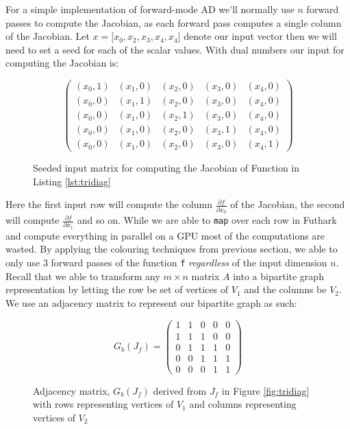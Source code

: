 	For a simple implementation of forward-mode AD we'll normally use
	$n$ forward passes to compute the Jacobian, as each forward pass computes a
	single column of the Jacobian. 	 Let $x = \lbrack x_0, x_2, x_3, x_4, x_4 \rbrack$ denote our input vector then
	we will need to set a seed for each of the scalar values. With dual numbers our input for computing the Jacobian is:
		\begin{figure}[H]
		$$ \left(\begin{matrix}
(x_0, 1) & (x_1, 0) & (x_2, 0) & (x_3, 0) & (x_4, 0) \\
(x_0, 0) & (x_1, 1) & (x_2, 0) & (x_3, 0) & (x_4, 0) \\
(x_0, 0) & (x_1, 0) & (x_2, 1) & (x_3, 0) & (x_4, 0) \\
(x_0, 0) & (x_1, 0) & (x_2, 0) & (x_3, 1) & (x_4, 0) \\
(x_0, 0) & (x_1, 0) & (x_2, 0) & (x_3, 0) & (x_4, 1)
		\end{matrix}\right) $$
		\caption{Seeded input matrix for computing the Jacobian of Function in Listing \ref{lst:tridiag}}
	\end{figure}
    Here the first input row will compute the column $\frac{\partial f}{\partial x_0}$ of the Jacobian,
    the second  will compute $\frac{\partial f}{\partial x_1}$ and so on.
	While we are able to \texttt{map} over each row in Futhark and compute everything in parallel on a GPU
	most of the computations are wasted.
	By applying the colouring techniques from previous section, we able to only use
	$3$ forward passes
	of the function \texttt{f} \emph{regardless} of the input dimension $n$.
	Recall that we able to transform any $m\times n$ matrix $A$ into a bipartite
	graph
	representation by letting the row be set of vertices of $V_1$ and the columns be
	$V_2$.
	We use an adjacency matrix to represent our bipartite graph as such:
	\begin{figure}[H]
		$$ G_b(J_f) = \left(\begin{matrix}
		1 & 1 & 0 & 0 & 0 \\
		1 & 1 & 1 & 0 & 0\\
		0 & 1 & 1 & 1 & 0\\
		0 & 0 & 1 & 1 & 1 \\
		0 & 0 & 0 & 1 & 1
		\end{matrix}\right) $$
		\caption{Adjacency matrix, $G_b(J_f)$ derived from \texttt{$J_f$} in Figure
			\ref{fig:tridiag} with rows representing vertices of $V_1$ and columns
			representing vertices of $V_2$}
	\end{figure}
